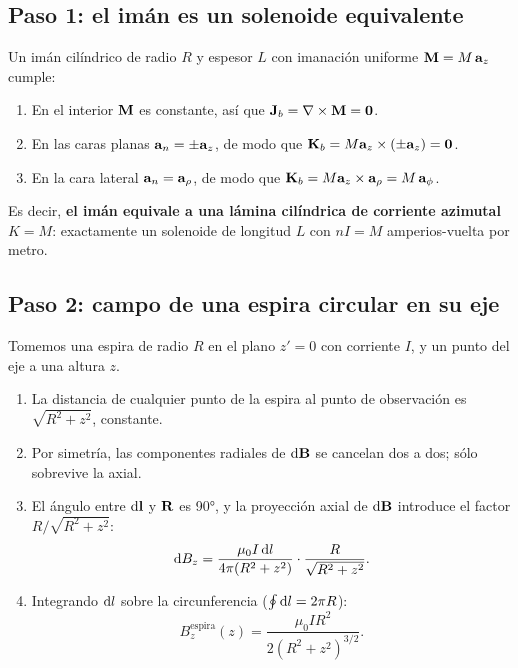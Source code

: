 \documentclass[11pt]{article}
\begin{document}
\subsection{Paso 1: el imán es un solenoide equivalente}
Un imán cilíndrico de radio $R$ y espesor $L$ con imanación uniforme $\mathbf{M}=M\,\mathbf{a}_{z}$ cumple:
\begin{enumerate}
  \item En el interior $\mathbf{M}$ es constante, así que $\mathbf{J}_b=\nabla\times\mathbf{M}=\mathbf{0}$.
  \item En las caras planas $\mathbf{a}_{n}=\pm\mathbf{a}_{z}$, de modo que $\mathbf{K}_b=M\mathbf{a}_{z}\times(\pm\mathbf{a}_{z})=\mathbf{0}$.
  \item En la cara lateral $\mathbf{a}_{n}=\mathbf{a}_{\rho}$, de modo que
        $\mathbf{K}_b=M\mathbf{a}_{z}\times\mathbf{a}_{\rho}=M\,\mathbf{a}_{\phi}$.
\end{enumerate}
Es decir, \textbf{el imán equivale a una lámina cilíndrica de corriente azimutal $K=M$}: exactamente un
solenoide de longitud $L$ con $nI=M$ amperios-vuelta por metro.

\subsection{Paso 2: campo de una espira circular en su eje}
Tomemos una espira de radio $R$ en el plano $z'=0$ con corriente $I$, y un punto del eje a una altura $z$.
\begin{enumerate}
  \item La distancia de cualquier punto de la espira al punto de observación es $\sqrt{R^2+z^2}$, constante.
  \item Por simetría, las componentes radiales de $\mathrm{d}\mathbf{B}$ se cancelan dos a dos; sólo sobrevive la axial.
  \item El ángulo entre $\mathrm{d}\mathbf{l}$ y $\mathbf{R}$ es \ang{90}, y la proyección axial de $\mathrm{d}\mathbf{B}$ introduce
        el factor $R/\sqrt{R^2+z^2}$:
        \[
          \mathrm{d} B_z = \frac{\mu_0 I\,\mathrm{d} l}{4\pi(R^2+z^2)}\cdot\frac{R}{\sqrt{R^2+z^2}} .
        \]
  \item Integrando $\mathrm{d} l$ sobre la circunferencia ($\oint\mathrm{d} l=2\pi R$):
        \begin{equation}
          B_z^{\text{espira}}(z) = \frac{\mu_0 I R^2}{2\left(R^2+z^2\right)^{3/2}} .
          \label{eq:espira}
        \end{equation}
\end{enumerate}
\end{document}
